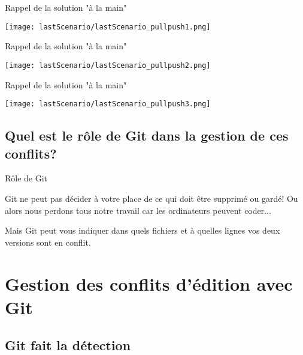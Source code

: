 \documentclass{beamer}
\begin{document}
\begin{frame}{Rappel de la solution "à la main"}
\begin{center}
    \texttt{[image: lastScenario/lastScenario\_pullpush1.png]}
\end{center}
\end{frame}

\begin{frame}{Rappel de la solution "à la main"}
\begin{center}
    \texttt{[image: lastScenario/lastScenario\_pullpush2.png]}
\end{center}
\end{frame}

\begin{frame}{Rappel de la solution "à la main"}
\begin{center}
    \texttt{[image: lastScenario/lastScenario\_pullpush3.png]}
\end{center}
\end{frame}


\subsection{Quel est le rôle de Git dans la gestion de ces conflits?}
\begin{frame}{Rôle de Git}

Git ne peut pas décider à votre place de ce qui doit être supprimé ou gardé! Ou alors nous perdons tous notre travail car les ordinateurs peuvent coder...\\
\medskip

Mais Git peut vous indiquer dans quels fichiers et à quelles lignes vos deux versions sont en conflit. 
    
\end{frame}



\section{Gestion des conflits d'édition avec Git}


\subsection{Git fait la détection}
\end{document}
